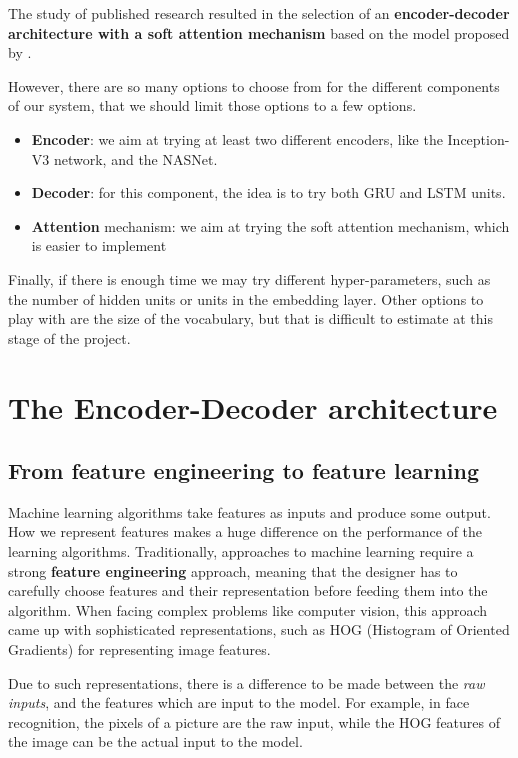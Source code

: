 The study of published research resulted in the selection of an \textbf{encoder-decoder architecture with a soft attention mechanism} based on the model proposed by \citet{Xu2015}. 

However, there are so many options to choose from for the different components of our system, that we should limit those options to a few options.
\begin{itemize}
    \item \textbf{Encoder}: we aim at trying at least two different encoders, like the Inception-V3 network, and the NASNet.
    \item \textbf{Decoder}: for this component, the idea is to try both GRU and LSTM units. 
    \item \textbf{Attention} mechanism: we aim at trying the soft attention mechanism, which is easier to implement
\end{itemize}

Finally, if there is enough time we may try different hyper-parameters, such as the number of hidden units or units in the embedding layer. Other options to play with are the size of the vocabulary, but that is difficult to estimate at this stage of the project.

\section{The Encoder-Decoder architecture}\label{sec:encoder-decoder}

\subsection{From feature engineering to feature learning}

Machine learning algorithms take features as inputs and produce some output. How we represent features makes a huge difference on the performance of the learning algorithms.  Traditionally, approaches to machine learning require a strong \textbf{feature engineering} approach, meaning that the designer has to carefully choose features and their representation before feeding them into the algorithm. When facing complex problems like computer vision, this approach came up with sophisticated representations, such as HOG (Histogram of Oriented Gradients) for representing image features.

Due to such representations, there is a difference to be made between the \textit{raw inputs}, and the features which are input to the model. For example, in face recognition, the pixels of a picture are the raw input, while the HOG features of the image can be the actual input to the model.

